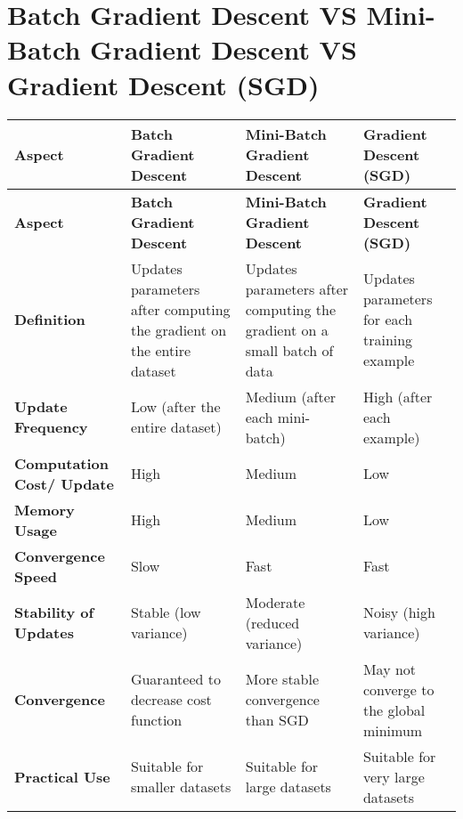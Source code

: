 \section{Batch Gradient Descent VS Mini-Batch Gradient Descent VS Gradient Descent (SGD) \cite{chatgpt}} \label{Batch Gradient Descent VS Mini-Batch Gradient Descent VS Gradient Descent (SGD)}

\begin{longtable}{|p{2.5cm}|p{4cm}|p{3.5cm}|p{3.5cm}|}
    \hline
    \textbf{Aspect} & \textbf{Batch Gradient Descent} & \textbf{Mini-Batch Gradient Descent} & \textbf{Gradient Descent (SGD)} \\
    \hline
    \endfirsthead
    
    \hline
    \textbf{Aspect} & \textbf{Batch Gradient Descent} & \textbf{Mini-Batch Gradient Descent} & \textbf{Gradient Descent (SGD)} \\
    \hline
    \endhead
    
    \hline\endfoot
    \hline\endlastfoot
    
    \textbf{Definition} & Updates parameters after computing the gradient on the entire dataset & Updates parameters after computing the gradient on a small batch of data & Updates parameters for each training example \\
    \hline

    \textbf{Update Frequency} & Low (after the entire dataset) & Medium (after each mini-batch) & High (after each example) \\
    \hline
    
    \textbf{Computation Cost/ Update} & High & Medium & Low \\
    \hline
    
    \textbf{Memory Usage} & High & Medium & Low \\
    \hline
    
    \textbf{Convergence Speed} & Slow & Fast & Fast \\
    \hline
    
    \textbf{Stability of Updates} & Stable (low variance) & Moderate (reduced variance) & Noisy (high variance) \\
    \hline
    
    \textbf{Convergence} & Guaranteed to decrease cost function & More stable convergence than SGD & May not converge to the global minimum \\
    \hline
    
    \textbf{Practical Use} & Suitable for smaller datasets & Suitable for large datasets & Suitable for very large datasets \\
    \hline
    

\end{longtable}
